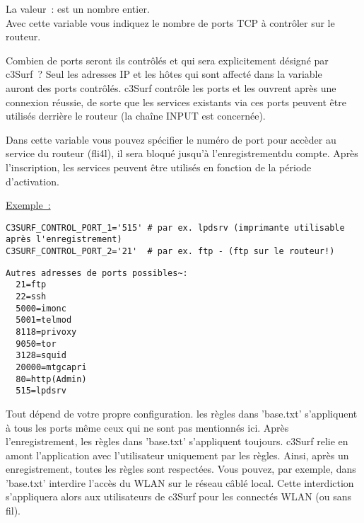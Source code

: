 \begin{itemize}
\begin{description}

  La valeur~: est un nombre entier.\\
  Avec cette variable vous indiquez le nombre de ports TCP à contrôler sur le routeur.

  Combien de ports seront ils contrôlés et qui sera explicitement désigné par c3Surf~?
  Seul les adresses IP et les hôtes qui sont affecté dans la variable\\
   auront des
  ports contrôlés. c3Surf contrôle les ports et les ouvrent après une connexion réussie,
  de sorte que les services existants via ces ports peuvent être utilisés derrière le routeur
  (la chaîne INPUT est concernée).



  Dans cette variable vous pouvez spécifier le numéro de port pour accèder au
  service du routeur (fli4l), il sera bloqué jusqu'à l'enregistrementdu compte.
  Après l'inscription, les services peuvent être utilisés en fonction de la période
  d'activation.

\underline{Exemple~:}
\begin{example}
\begin{verbatim}
C3SURF_CONTROL_PORT_1='515' # par ex. lpdsrv (imprimante utilisable après l'enregistrement)
C3SURF_CONTROL_PORT_2='21'  # par ex. ftp - (ftp sur le routeur!)
\end{verbatim}
\end{example}

\begin{example}
\begin{verbatim}
Autres adresses de ports possibles~:
  21=ftp
  22=ssh
  5000=imonc
  5001=telmod
  8118=privoxy
  9050=tor
  3128=squid
  20000=mtgcapri
  80=http(Admin)
  515=lpdsrv
\end{verbatim}
\end{example}

        Tout dépend de votre propre configuration. les règles dans 'base.txt'
		s'appliquent à tous les ports même ceux qui ne sont pas mentionnés ici.
		Après l'enregistrement, les règles dans 'base.txt' s'appliquent toujours.
		c3Surf relie en amont l'application avec l'utilisateur uniquement par
		les règles. Ainsi, après un enregistrement, toutes les règles sont respectées.
		Vous pouvez, par exemple, dans 'base.txt' interdire l'accès du WLAN sur
		le réseau câblé local. Cette interdiction s'appliquera alors aux utilisateurs
		de c3Surf pour les connectés WLAN (ou sans fil).


\end{description}
\end{itemize}

